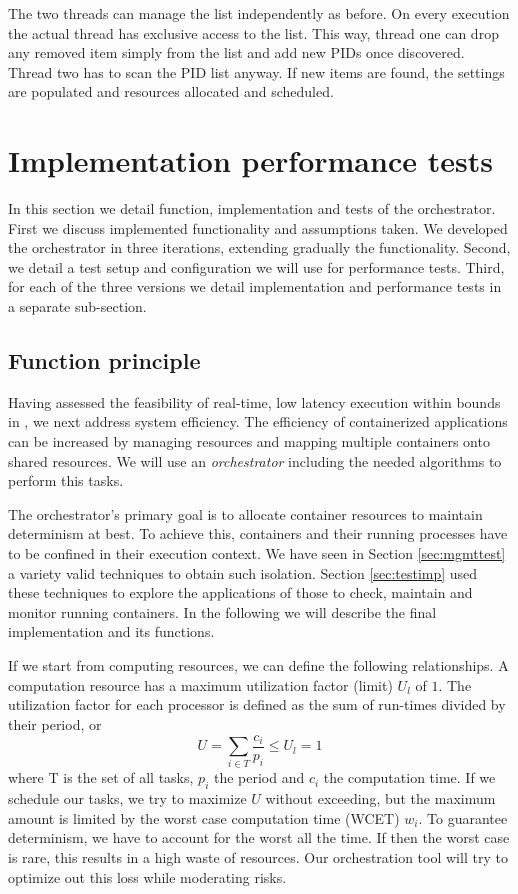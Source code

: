 \documentclass[]{scrartcl}
\begin{document}
The two threads can manage the list independently as before. On every execution the actual thread has exclusive access to the list.
This way, thread one can drop any removed item simply from the list and add new PIDs once discovered. 
Thread two has to scan the PID list anyway.
If new items are found, the settings are populated and resources allocated and scheduled.

\section{Implementation performance tests}
\label{sec:perftest}

In this section we detail function, implementation and tests of the orchestrator.
First we discuss implemented functionality and assumptions taken. 
We developed the orchestrator in three iterations, extending gradually the functionality.
Second, we detail a test setup and configuration we will use for performance tests.
Third, for each of the three versions we detail implementation and performance tests in a separate sub-section. 

\subsection{Function principle}
\label{sub:funcdesc}


Having assessed the feasibility of real-time, low latency execution within bounds in \cite{Hoferetal2019}, we next address system efficiency.
The efficiency of containerized applications can be increased by managing resources and mapping multiple containers onto shared resources.
We will use an \emph{orchestrator} including the needed algorithms to perform this tasks.

The orchestrator's primary goal is to allocate container resources to maintain determinism at best.
To achieve this, containers and their running processes have to be confined in their execution context. 
We have seen in Section \ref{sec:mgmttest} a variety valid techniques to obtain such isolation.
Section \ref{sec:testimp} used these techniques to explore the applications of those to check, maintain and monitor running containers.
In the following we will describe the final implementation and its functions.

If we start from computing resources, we can define the following relationships.
A computation resource has a maximum utilization factor (limit) $U_l$ of $1$.
The utilization factor for each processor is defined as the sum of run-times divided by their period, or
\begin{equation}
	U = \sum_{i \in T}^{}{\frac{c_i}{p_i}} \leq U_l = 1
\end{equation}  
where T is the set of all tasks, $p_i$ the period and $c_i$ the computation time.
If we schedule our tasks, we try to maximize $U$ without exceeding, but the maximum amount is limited by the worst case computation time (WCET) $w_i$.
To guarantee determinism, we have to account for the worst all the time.
If then the worst case is rare, this results in a high waste of resources.
Our orchestration tool will try to optimize out this loss while moderating risks.
\end{document}
